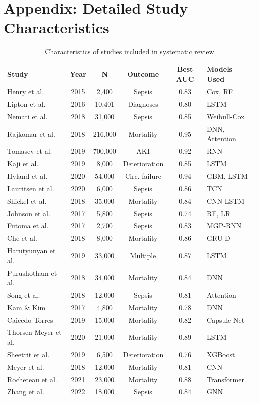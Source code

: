 \section{Appendix: Detailed Study Characteristics}

\begin{table}[H]
\centering
\caption{Characteristics of studies included in systematic review}
\label{tab:studies_detail}
\small
\begin{tabular}{p{2.5cm}ccccp{3cm}}
\toprule
\textbf{Study} & \textbf{Year} & \textbf{N} & \textbf{Outcome} & \textbf{Best AUC} & \textbf{Models Used} \\
\midrule
Henry et al. & 2015 & 2,400 & Sepsis & 0.83 & Cox, RF \\
Lipton et al. & 2016 & 10,401 & Diagnoses & 0.80 & LSTM \\
Nemati et al. & 2018 & 31,000 & Sepsis & 0.85 & Weibull-Cox \\
Rajkomar et al. & 2018 & 216,000 & Mortality & 0.95 & DNN, Attention \\
Tomasev et al. & 2019 & 700,000 & AKI & 0.92 & RNN \\
Kaji et al. & 2019 & 8,000 & Deterioration & 0.85 & LSTM \\
Hyland et al. & 2020 & 54,000 & Circ. failure & 0.94 & GBM, LSTM \\
Lauritsen et al. & 2020 & 6,000 & Sepsis & 0.86 & TCN \\
Shickel et al. & 2018 & 35,000 & Mortality & 0.84 & CNN-LSTM \\
Johnson et al. & 2017 & 5,800 & Sepsis & 0.74 & RF, LR \\
Futoma et al. & 2017 & 2,700 & Sepsis & 0.83 & MGP-RNN \\
Che et al. & 2018 & 8,000 & Mortality & 0.86 & GRU-D \\
Harutyunyan et al. & 2019 & 33,000 & Multiple & 0.87 & LSTM \\
Purushotham et al. & 2018 & 34,000 & Mortality & 0.84 & DNN \\
Song et al. & 2018 & 12,000 & Sepsis & 0.81 & Attention \\
Kam \& Kim & 2017 & 4,800 & Mortality & 0.78 & DNN \\
Caicedo-Torres & 2019 & 15,000 & Mortality & 0.82 & Capsule Net \\
Thorsen-Meyer et al. & 2020 & 21,000 & Mortality & 0.89 & LSTM \\
Sheetrit et al. & 2019 & 6,500 & Deterioration & 0.76 & XGBoost \\
Meyer et al. & 2018 & 12,000 & Mortality & 0.81 & CNN \\
Rocheteau et al. & 2021 & 23,000 & Mortality & 0.88 & Transformer \\
Zhang et al. & 2022 & 18,000 & Sepsis & 0.84 & GNN \\
\bottomrule
\end{tabular}
\end{table}


